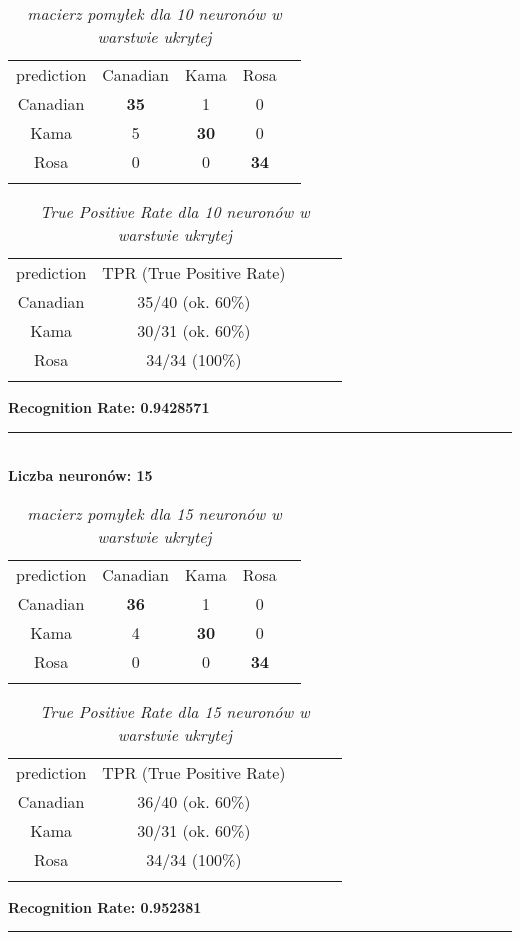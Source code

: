 \documentclass[a4paper,12pt]{article}
\newcommand{\linia}{\rule{\linewidth}{0.5pt}}
\theoremstyle{mytheor}
\begin{document}
\begin{table}[H]
\begin{tabular}{ccccc}
prediction & Canadian & Kama & Rosa  &  \\
Canadian & \textbf{35} & 1 & 0 &  \\
Kama & 5 & \textbf{30} & 0 &  \\
Rosa & 0 & 0 & \textbf{34} &  \\
&&&& 
\end{tabular}
\caption{\textit{macierz pomyłek dla 10 neuronów w warstwie ukrytej}}
\label{tab:3}
\end{table}
\begin{table}[H]
\begin{tabular}{ccccc}
prediction & TPR (True Positive Rate) &  \\
Canadian & 35/40 (ok. 60\%) & \\
Kama & 30/31 (ok. 60\%) & \\
Rosa & 34/34 (100\%) & \\
&&
\end{tabular}
\caption{\textit{True Positive Rate dla 10 neuronów w warstwie ukrytej}}
\label{tab:4}
\end{table}
\textbf{Recognition Rate: 0.9428571}\\
\linia\\

\textbf{Liczba neuronów: 15}\\

\begin{table}[H]
\begin{tabular}{ccccc}
prediction & Canadian & Kama & Rosa  &  \\
Canadian & \textbf{36} & 1 & 0 &  \\
Kama & 4 & \textbf{30} & 0 &  \\
Rosa & 0 & 0 & \textbf{34} &  \\
&&&& 
\end{tabular}
\caption{\textit{macierz pomyłek dla 15 neuronów w warstwie ukrytej}}
\label{tab:5}
\end{table}
\begin{table}[H]
\begin{tabular}{ccccc}
prediction & TPR (True Positive Rate) &  \\
Canadian & 36/40 (ok. 60\%) & \\
Kama & 30/31 (ok. 60\%) & \\
Rosa & 34/34 (100\%) & \\
&&
\end{tabular}
\caption{\textit{True Positive Rate dla 15 neuronów w warstwie ukrytej}}
\label{tab:6}
\end{table}
\textbf{Recognition Rate: 0.952381}\\
\linia\\
\end{document}
